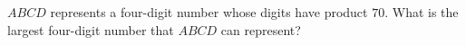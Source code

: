 $ABCD$ represents a four-digit number whose digits have product $70$. What is the largest four-digit number that $ABCD$ can represent?
